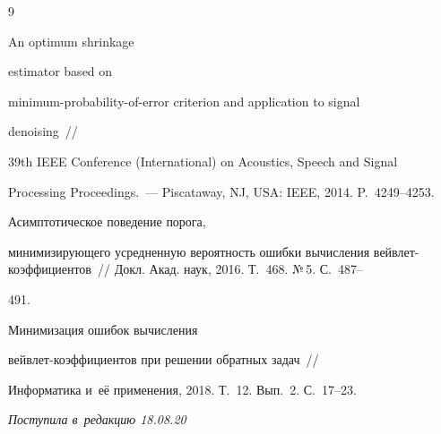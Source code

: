 {{\begin{thebibliography}{9}


 An optimum shrinkage 


estimator based on  


minimum-probability-of-error criterion and application to signal 


denoising~/\!\!/


    39th IEEE Conference (International) on Acoustics, Speech and Signal 


Processing Proceedings.~--- Piscataway, NJ, USA: IEEE, 2014. P.~4249--4253.







 Асимптотическое поведение порога, 


минимизирующего усредненную вероятность ошибки вычисления вейв\-лет-ко\-эф\-фи\-ци\-ен\-тов~/\!\!/ Докл. Акад. наук, 2016. Т.~468. №\,5. С.~487--


491.







 Минимизация ошибок вычисления 


вейв\-лет-ко\-эф\-фи\-ци\-ен\-тов при решении обратных задач~/\!\!/ 


Информатика и~её применения, 2018. Т.~12. Вып.~2. С.~17--23.





\end{thebibliography}


} }








\vspace*{-3pt}





\hfill{\small\textit{Поступила в~редакцию 18.08.20}}














\vspace*{6pt}





